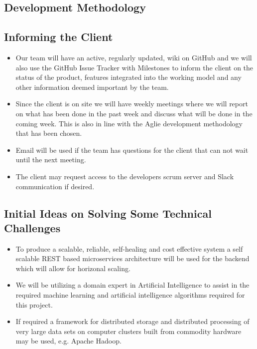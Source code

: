 \subsection{Development Methodology}


\subsection{Informing the Client}
\begin{itemize}
  \item Our team will have an active, regularly updated, wiki on GitHub and we will also use the GitHub Issue Tracker with Milestones to inform the client on the status of the product, features integrated into the working model and any other information deemed important by the team.
	\item Since the client is on site we will have weekly meetings where we will report on what has been done in the past week and discuss what will be done in the coming week. This is also in line with the Aglie development methodology that has been chosen.
	\item Email will be used if the team has questions for the client that can not wait until the next meeting.
	\item The client may request access to the developers scrum server and Slack communication if desired.
\end{itemize}

\subsection{Initial Ideas on Solving Some Technical Challenges}
\begin{itemize}
  \item To produce a scalable, reliable, self-healing and cost effective system a self scalable REST based microservices architecture will be used for the backend which will allow for horizonal scaling.
	\item We will be utilizing a domain expert in Artificial Intelligence to assist in the required machine learning and artificial intelligence algorithms required for this project.
  \item If required a framework for distributed storage and distributed processing of very large data sets on computer clusters built from commodity hardware may be used, e.g. Apache Hadoop.
\end{itemize}

